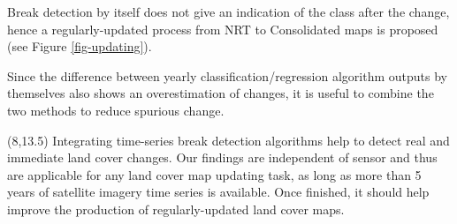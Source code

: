 \documentclass[20pt]{beamer}
\begin{document}
\begin{frame}{}
\begin{textblock}{7}
            Break detection by itself does not give an indication of the class after the change, hence a regularly-updated process from NRT to Consolidated maps is proposed (see Figure \ref{fig-updating}).
            
            Since the difference between yearly classification/regression algorithm outputs by themselves also shows an overestimation of changes, it is useful to combine the two methods to reduce spurious change.
            
		
% 		



	\end{textblock}

	\begin{textblock}{7}(8,13.5)
		\Line
            Integrating time-series break detection algorithms help to detect real and immediate land cover changes. Our findings are independent of sensor and thus are applicable for any land cover map updating task, as long as more than 5 years of satellite imagery time series is available. Once finished, it should help improve the production of regularly-updated land cover maps.
            

\end{textblock}
\end{frame}
\end{document}
